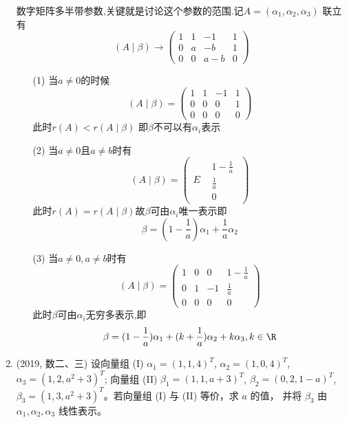 \documentclass[12pt, a4paper, oneside, UTF8]{ctexbook}
\begin{document}
\begin{enumerate}
    \begin{solution}
    数字矩阵多半带参数,关键就是讨论这个参数的范围.记$A=\left(\alpha_1,\alpha_2,\alpha_3\right)$ 联立有
    $$
    (A\mid\beta) \rightarrow \begin{pmatrix}
        1 & 1 & -1 & 1\\
        0 & a & -b & 1 \\
        0 & 0 & a-b & 0
    \end{pmatrix}
    $$
    \begin{enumerate}
        \item [(1)] 当$a\neq 0$的时候
        $$
        (A\mid\beta) = \begin{pmatrix}
            1 & 1 & -1 & 1 \\
            0 & 0 & 0 &  1 \\
            0 & 0 & 0 & 0
        \end{pmatrix}
        $$
        此时$r(A)<r(A\mid\beta)$ 即$\beta$不可以有$\alpha_i$表示
        \item [(2)] 当$a\neq 0$且$a\neq b$时有
        $$
        (A\mid\beta) = \begin{pmatrix}
            E  & \begin{matrix}
                1 - \frac{1}{a} \\
                \frac{1}{a} \\
                0
            \end{matrix}
        \end{pmatrix}
        $$
        此时$r(A)=r(A\mid\beta)$故$\beta$可由$\alpha_i$唯一表示即
        $$
        \beta = (1-\frac{1}{a})\alpha_1+\frac{1}{a}\alpha_2
        $$
        \item [(3)] 当$a\neq 0, a\neq b$时有
        $$
        (A\mid\beta) = \begin{pmatrix}
            1 & 0 & 0 & 1-\frac{1}{a} \\
            0 & 1 & -1 & \frac{1}{a} \\
            0 & 0 & 0 & 0
        \end{pmatrix}
        $$
        此时$\beta$可由$\alpha_i$无穷多表示,即
        $$
        \beta = (1-\frac{1}{a})\alpha_1 + (k+\frac{1}{a})\alpha_2 + k\alpha_3, k\in\R 
        $$
    \end{enumerate}
    \end{solution}
    
    \item (2019, 数二、三) 设向量组 (I) $\alpha_1 = (1,1,4)^T$, $\alpha_2 = (1,0,4)^T$, $\alpha_3 = (1,2, a^2+3)^T$;
    向量组 (II) $\beta_1 = (1,1, a+3)^T$, $\beta_2 = (0,2,1-a)^T$, $\beta_3 = (1,3, a^2+3)^T$。若向量组 (I) 与 (II) 等价，求 $a$ 的值，
    并将 $\beta_3$ 由 $\alpha_1, \alpha_2, \alpha_3$ 线性表示。
    

\end{enumerate}
\end{document}
